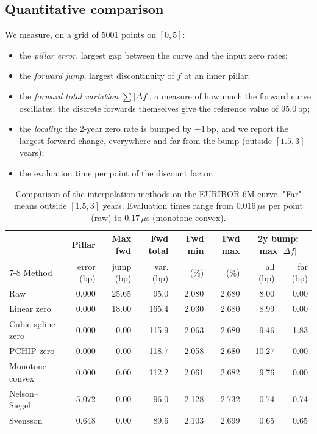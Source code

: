 \documentclass[11pt,a4paper]{article}
\theoremstyle{plain}
\theoremstyle{definition}
\newcommand{\bp}{\,\mathrm{bp}}
\begin{document}
\subsection{Quantitative comparison}
We measure, on a grid of 5001 points on $[0,5]$:
\begin{itemize}
    \item the \emph{pillar error}, largest gap between the curve and the input zero rates;
    \item the \emph{forward jump}, largest discontinuity of $f$ at an inner pillar;
    \item the \emph{forward total variation} $\sum|\Delta f|$, a measure of how much the forward curve oscillates; the discrete forwards themselves give the reference value of $95.0\bp$;
    \item the \emph{locality}: the 2-year zero rate is bumped by $+1\bp$, and we report the largest forward change, everywhere and far from the bump (outside $[1.5,3]$ years);
    \item the evaluation time per point of the discount factor.
\end{itemize}

\begin{table}[htbp]
\centering
\small
\begin{tabular}{@{}lrrrrrrr@{}}
\toprule
& Pillar & Max fwd & Fwd total & Fwd min & Fwd max & \multicolumn{2}{c}{2y bump: max $|\Delta f|$} \\
\cmidrule(l){7-8}
Method & error (bp) & jump (bp) & var. (bp) & (\%) & (\%) & all (bp) & far (bp) \\
\midrule
Raw & 0.000 & 25.65 & 95.0 & 2.080 & 2.680 & 8.00 & 0.00 \\
Linear zero & 0.000 & 18.00 & 165.4 & 2.030 & 2.680 & 8.99 & 0.00 \\
Cubic spline zero & 0.000 & 0.00 & 115.9 & 2.063 & 2.680 & 9.46 & 1.83 \\
PCHIP zero & 0.000 & 0.00 & 118.7 & 2.058 & 2.680 & 10.27 & 0.00 \\
Monotone convex & 0.000 & 0.00 & 112.2 & 2.061 & 2.682 & 9.76 & 0.00 \\
Nelson--Siegel & 5.072 & 0.00 & 96.0 & 2.128 & 2.732 & 0.74 & 0.74 \\
Svensson & 0.648 & 0.00 & 89.6 & 2.103 & 2.699 & 0.65 & 0.65 \\
\bottomrule
\end{tabular}
\caption{Comparison of the interpolation methods on the EURIBOR 6M curve. "Far" means outside $[1.5,3]$ years. Evaluation times range from $0.016\,\mu$s per point (raw) to $0.17\,\mu$s (monotone convex).}
\label{tab:comparison}
\end{table}
\end{document}

